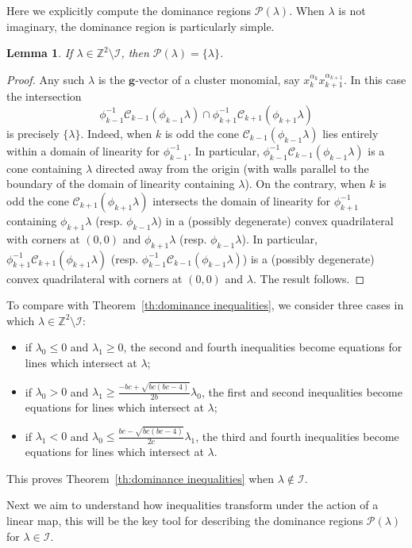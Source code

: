 \documentclass{amsart}
\newtheorem{lemma}[theorem]{Lemma}
\numberwithin{theorem}{section}
\newcommand{\bfg}{\boldsymbol{g}}
\newcommand{\cC}{\mathcal{C}}
\newcommand{\cI}{\mathcal{I}}
\newcommand{\cP}{\mathcal{P}}
\newcommand{\ZZ}{\mathbb{Z}}
\begin{document}
  Here we explicitly compute the dominance regions $\cP(\lambda)$.
  When $\lambda$ is not imaginary, the dominance region is particularly simple.
  \begin{lemma}
    If $\lambda\in\ZZ^2\setminus\cI$, then $\cP(\lambda)=\{\lambda\}$.
  \end{lemma}
  \begin{proof}
    Any such $\lambda$ is the $\bfg$-vector of a cluster monomial, say $x_k^{\alpha_k}x_{k+1}^{\alpha_{k+1}}$.
    In this case the intersection
    \[\phi_{k-1}^{-1}\cC_{k-1}(\phi_{k-1}\lambda) \cap \phi_{k+1}^{-1}\cC_{k+1}(\phi_{k+1}\lambda)\]
    is precisely $\{\lambda\}$. 
    Indeed, when $k$ is odd the cone $\cC_{k-1}(\phi_{k-1}\lambda)$ lies entirely within a domain of linearity for $\phi_{k-1}^{-1}$.
    In particular, $\phi_{k-1}^{-1}\cC_{k-1}(\phi_{k-1}\lambda)$ is a cone containing $\lambda$ directed away from the origin (with walls parallel to the boundary of the domain of linearity containing $\lambda$).
    On the contrary, when $k$ is odd the cone $\cC_{k+1}(\phi_{k+1}\lambda)$ intersects the domain of linearity for $\phi_{k+1}^{-1}$ containing $\phi_{k+1}\lambda$ (resp. $\phi_{k-1}\lambda$) in a (possibly degenerate) convex quadrilateral with corners at $(0,0)$ and $\phi_{k+1}\lambda$ (resp. $\phi_{k-1}\lambda$).
    In particular, $\phi_{k+1}^{-1}\cC_{k+1}(\phi_{k+1}\lambda)$ (resp. $\phi_{k-1}^{-1}\cC_{k-1}(\phi_{k-1}\lambda)$) is a (possibly degenerate) convex quadrilateral with corners at $(0,0)$ and $\lambda$.
    The result follows.
  \end{proof}
  To compare with Theorem~\ref{th:dominance inequalities}, we consider three cases in which $\lambda\in\ZZ^2\setminus\cI$:
  \begin{itemize}
    \item if $\lambda_0 \le 0$ and $\lambda_1 \ge 0$, the second and fourth inequalities become equations for lines which intersect at $\lambda$;
    \item if $\lambda_0 > 0$ and $\lambda_1 \ge \frac{-bc+\sqrt{bc(bc-4)}}{2b}\lambda_0$, the first and second inequalities become equations for lines which intersect at $\lambda$;
    \item if $\lambda_1 < 0$ and $\lambda_0 \le \frac{bc-\sqrt{bc(bc-4)}}{2c}\lambda_1$, the third and fourth inequalities become equations for lines which intersect at $\lambda$.
  \end{itemize}
  This proves Theorem~\ref{th:dominance inequalities} when $\lambda\notin\cI$.

  Next we aim to understand how inequalities transform under the action of a linear map, this will be the key tool for describing the dominance regions $\cP(\lambda)$ for $\lambda\in\cI$.
\end{document}
